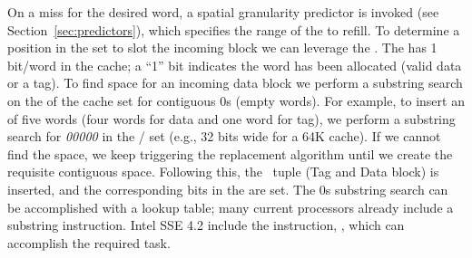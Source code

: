 On a miss for the desired word, a spatial granularity predictor is invoked (see Section~\ref{sec:predictors}), which specifies the range of the \AB{} to refill. To determine a position in the set to slot the incoming block we can leverage the . The  has 1 bit/word in the cache; a ``1'' bit indicates the word has been allocated (valid data or a tag). To find space for an incoming data block we perform a substring search on the  of the cache set for contiguous 0s (empty words). For example, to insert an \AB{} of five words (four words for data and one word for tag), we perform a substring search for \textit{00000} in the  / set (e.g., 32 bits wide for a 64K cache). If we cannot find the space, we keep triggering the replacement algorithm until we create the requisite contiguous space. Following this, the \AB\ tuple (Tag and Data block) is inserted, and the corresponding bits in the  are set. The 0s substring search can be accomplished with a lookup table; many current processors already include a substring instruction. Intel SSE 4.2 include the instruction, , which can accomplish the required task.






